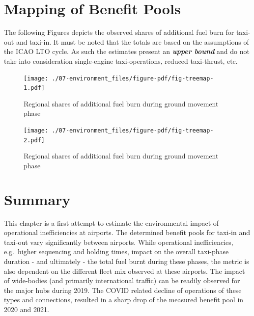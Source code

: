 \documentclass[
  a4paper,
  DIV=11,
  numbers=noendperiod]{scrreprt}
\begin{document}
\hypertarget{mapping-of-benefit-pools}{%
\section{Mapping of Benefit Pools}\label{mapping-of-benefit-pools}}

The following Figures depicts the observed shares of additional fuel
burn for taxi-out and taxi-in. It must be noted that the totals are
based on the assumptions of the ICAO LTO cycle. As such the estimates
present an \textbf{\emph{upper bound}} and do not take into
consideration single-engine taxi-operations, reduced taxi-thrust, etc.

\begin{figure}[h]

{\centering \texttt{[image: ./07-environment\_files/figure-pdf/fig-treemap-1.pdf]}

}

\caption{\label{fig-treemap-1}Regional shares of additional fuel burn
during ground movement phase}

\end{figure}

\begin{figure}[h]

{\centering \texttt{[image: ./07-environment\_files/figure-pdf/fig-treemap-2.pdf]}

}

\caption{\label{fig-treemap-2}Regional shares of additional fuel burn
during ground movement phase}

\end{figure}

\hypertarget{summary-5}{%
\section{Summary}\label{summary-5}}

This chapter is a first attempt to estimate the environmental impact of
operational inefficiencies at airports. The determined benefit pools for
taxi-in and taxi-out vary significantly between airports. While
operational inefficiencies, e.g.~higher sequencing and holding times,
impact on the overall taxi-phase duration - and ultimately - the total
fuel burnt during these phases, the metric is also dependent on the
different fleet mix observed at these airports. The impact of
wide-bodies (and primarily international traffic) can be readily
observed for the major hubs during 2019. The COVID related decline of
operations of these types and connections, resulted in a sharp drop of
the measured benefit pool in 2020 and 2021.
\end{document}
